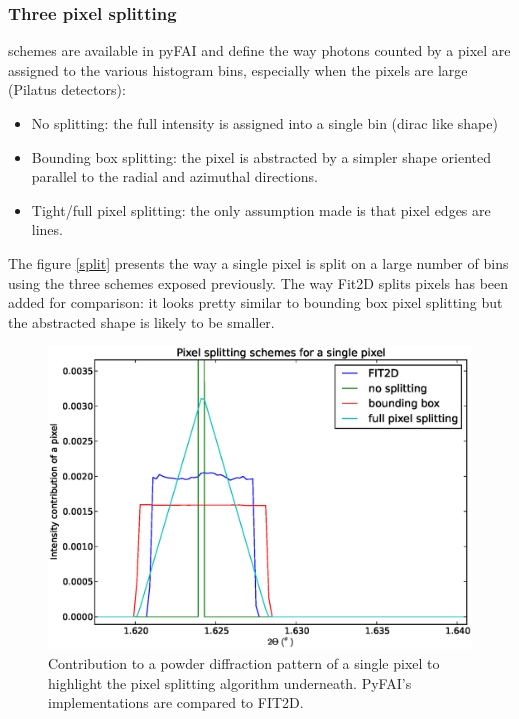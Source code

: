\documentclass[preprint]{iucr}
\begin{document}
\subsubsection{Three pixel splitting} schemes are available in pyFAI and define
the way photons counted by a pixel are assigned to the various histogram bins,
especially when the pixels are large (Pilatus detectors):
\begin{itemize}
\item No splitting: the full intensity is assigned into a single bin (dirac
like shape)
\item Bounding box splitting: the pixel is abstracted by a simpler shape
oriented parallel to the radial and azimuthal directions.
\item
Tight/full pixel splitting: the only assumption made is that pixel
edges are lines. 
\end{itemize}
The figure \ref{split} presents the way a single pixel is split on a 
large number of bins using the three schemes exposed previously. The way Fit2D
splits pixels has been added for comparison: it looks pretty similar to bounding
box pixel splitting but the abstracted shape is likely to be smaller.

\begin{figure}
\label{calib}
\begin{center}
\includegraphics[width=15cm]{splitpixel.eps}
\caption{Contribution to a powder diffraction pattern of a single pixel to
highlight the pixel splitting algorithm underneath. PyFAI's implementations are
compared to FIT2D.}
\end{center}
\end{figure}
\end{document}
